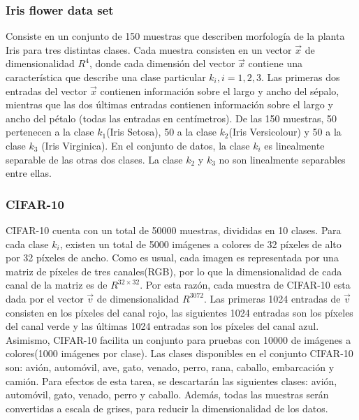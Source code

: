 \documentclass[conference]{IEEEtran}
\begin{document}
 	\subsubsection{Iris flower data set} 
    
   Consiste en un conjunto de 150 muestras que describen morfología de la planta Iris para tres distintas clases. Cada muestra consisten en un vector $\vec{x}$ de dimensionalidad $R^4$, donde cada dimensión del vector $\vec{x}$ contiene una característica que describe una clase particular $k_i, i= 1,2,3$. Las primeras dos entradas del vector $\vec{x}$ contienen información sobre el largo y ancho del sépalo, mientras que las dos últimas entradas contienen información sobre el largo y ancho del pétalo (todas las entradas en centímetros). 
   De las 150 muestras, 50 pertenecen a la clase $k_1$(Iris Setosa), 50 a la clase $k_2$(Iris Versicolour) y 50 a la clase $k_3$ (Iris Virginica). En el conjunto de datos, la clase $k_i$ es linealmente separable de las otras dos clases. La clase $k_2$ y $k_3$ no son linealmente separables entre ellas.
   
   \subsubsection{CIFAR-10}
   \label{sub:cifar}
   CIFAR-10 cuenta con un total de 50000 muestras, divididas en 10 clases. Para cada clase $k_i$, existen un total de 5000 imágenes a colores de 32 píxeles de alto por 32 píxeles de ancho.
   Como es usual, cada imagen es representada por una matriz de píxeles de tres canales(RGB), por lo que la dimensionalidad de cada canal de la matriz es de $R^{32 \times 32}$. Por esta razón, cada muestra de CIFAR-10 esta dada por el vector $\vec{v}$ de dimensionalidad $R^3072$. Las primeras 1024 entradas de $\vec{v}$ consisten en los píxeles del canal rojo, las siguientes 1024 entradas son los píxeles del canal verde y las últimas 1024 entradas son los píxeles del canal azul.   Asimismo, CIFAR-10 facilita un conjunto para pruebas con 10000 de imágenes a colores(1000 imágenes por clase). 
   Las clases disponibles en el conjunto CIFAR-10 son: avión, automóvil, ave, gato, venado, perro, rana, caballo, embarcación y camión. Para efectos de esta tarea, se descartarán las siguientes clases: avión, automóvil, gato, venado, perro y caballo. Además, todas las muestras serán convertidas a escala de grises, para reducir la dimensionalidad de los datos.
      
\end{document}
